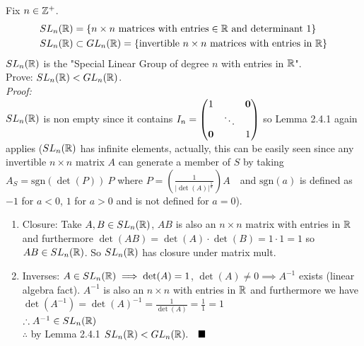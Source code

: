 \begin{example}
Fix $n\in {\mathbb{Z}}^+$.
\begin{align}
    SL_n({\mathbb{R}})&=\{ n\times n \text{ matrices with entries}\in {\mathbb{R}} \text{ and determinant }1\} \nonumber \\
    SL_n({\mathbb{R}})&\subset GL_n({\mathbb{R}})=\{\text{invertible }n\times n\text{ matrices with entries in } {\mathbb{R}}\}\nonumber
\end{align}
$SL_n({\mathbb{R}})$ is the "Special Linear Group of degree $n$ with entries in ${\mathbb{R}}$".\\
\noindent Prove: $SL_n({\mathbb{R}})<GL_n({\mathbb{R}})$.\\
\textit{Proof:}\\
\noindent $SL_n({\mathbb{R}})$ is non empty since it contains $I_n=\begin{pmatrix}
1 &  &{\mathbf{0}} \\
 & \ddots &  \\
{\mathbf{0}}&&1
\end{pmatrix}$ so Lemma 2.4.1 again applies ($SL_n({\mathbb{R}})$ has infinite elements, actually, this can be easily seen since any invertible $n\times n$ matrix $A$ can generate a member of $S$ by taking $A_{S}=\text{sgn}(\det(P))\ P$  where  $P=\left(\frac{1}{|\det(A)|^{\frac{1}{n}}}\right) A \ \ \ $ and $\text{sgn}(a)$ is defined as $-1$ for $a<0$, $1$ for $a>0$ and is not defined for $a=0$).\\

\begin{enumerate}
    \item Closure: Take $A,B\in SL_n({\mathbb{R}})$, $AB$ is also an $n\times n$ matrix with entries in ${\mathbb{R}}$
    and furthermore $\det(AB)=\det(A)\cdot \det(B)=1\cdot 1=1$ so $AB\in SL_n({\mathbb{R}})$. So $SL_n({\mathbb{R}})$
    has closure under matrix mult.
    \item Inverses: $A\in SL_n({\mathbb{R}})\implies \det(A)=1$, $\det(A)\neq 0 \implies A^{-1}$ exists
    (linear algebra fact). $A^{-1}$ is also an $n\times n$ with entries in ${\mathbb{R}}$ and furthermore we
    have $\det(A^{-1})=\det(A)^{-1}=\frac{1}{\det(A)}=\frac{1}{1}=1$\\
     $\therefore A^{-1}\in SL_n({\mathbb{R}})$\\
     \noindent $\therefore$ by Lemma 2.4.1 $SL_n(\R)<GL_n(\R). \ \ \ \blacksquare$
\end{enumerate}
\end{example}

